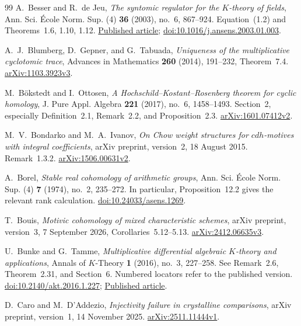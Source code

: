 \begin{thebibliography}{99}
A.~Besser and R.~de Jeu, \emph{The syntomic regulator for the $K$-theory of fields}, Ann. Sci. \'Ecole Norm. Sup. (4) \textbf{36} (2003), no.~6, 867--924. Equation~(1.2) and Theorems~1.6, 1.10, 1.12.
\href{https://www.numdam.org/article/ASENS_2003_4_36_6_867_0.pdf}{Published article};
\href{https://doi.org/10.1016/j.ansens.2003.01.003}{doi:10.1016/j.ansens.2003.01.003}.

A.~J.~Blumberg, D.~Gepner, and G.~Tabuada,
\emph{Uniqueness of the multiplicative cyclotomic trace},
Advances in Mathematics \textbf{260} (2014), 191--232, Theorem~7.4.
\href{https://arxiv.org/abs/1103.3923v3}{arXiv:1103.3923v3}.

M.~B\"okstedt and I.~Ottosen,
\emph{A Hochschild--Kostant--Rosenberg theorem for cyclic homology},
J. Pure Appl. Algebra \textbf{221} (2017), no.~6, 1458--1493.
Section~2, especially Definition~2.1, Remark~2.2, and Proposition~2.3.
\href{https://arxiv.org/abs/1601.07412v2}{arXiv:1601.07412v2}.

M.~V.~Bondarko and M.~A.~Ivanov,
\emph{On Chow weight structures for $cdh$-motives with integral coefficients},
arXiv preprint, version~2, 18 August 2015. Remark~1.3.2.
\href{https://arxiv.org/abs/1506.00631v2}{arXiv:1506.00631v2}.

A.~Borel, \emph{Stable real cohomology of arithmetic groups}, Ann. Sci. \'Ecole Norm. Sup. (4) \textbf{7} (1974), no.~2, 235--272. In particular, Proposition~12.2 gives the relevant rank calculation.
\href{https://doi.org/10.24033/asens.1269}{doi:10.24033/asens.1269}.

T.~Bouis, \emph{Motivic cohomology of mixed characteristic schemes},
arXiv preprint, version~3, 7 September 2026, Corollaries~5.12--5.13.
\href{https://arxiv.org/abs/2412.06635v3}{arXiv:2412.06635v3}.

U.~Bunke and G.~Tamme, \emph{Multiplicative differential algebraic $K$-theory and applications}, Annals of $K$-Theory \textbf{1} (2016), no.~3, 227--258. See Remark~2.6, Theorem~2.31, and Section~6.
Numbered locators refer to the published version.
\href{https://doi.org/10.2140/akt.2016.1.227}{doi:10.2140/akt.2016.1.227};
\href{https://msp.org/akt/2016/1-3/akt-v1-n3-p01-s.pdf}{Published article}.

D.~Caro and M.~D'Addezio,
\emph{Injectivity failure in crystalline comparisons},
arXiv preprint, version~1, 14 November 2025.
\href{https://arxiv.org/abs/2511.11444v1}{arXiv:2511.11444v1}.


\end{thebibliography}
